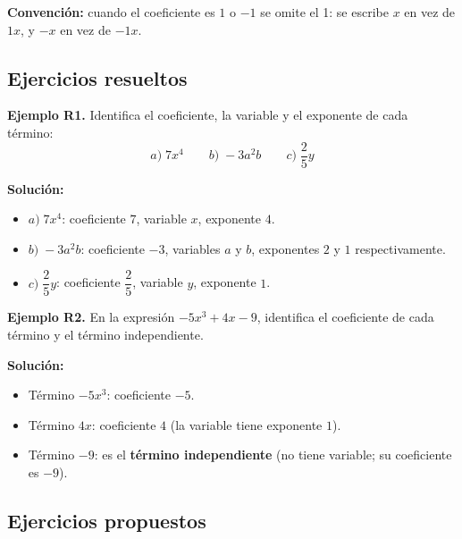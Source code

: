 \documentclass[12pt, letterpaper]{article}
\begin{document}
\begin{cuadroextra}
  \textbf{Convención:} cuando el coeficiente es $1$ o $-1$ se omite el 1: se escribe $x$ en vez de $1x$, y $-x$ en vez de $-1x$.
\end{cuadroextra}

\subsection{Ejercicios resueltos}

\textbf{Ejemplo R1.} Identifica el coeficiente, la variable y el exponente de cada término:
$$a) \; 7x^4 \qquad b) \; -3a^2b \qquad c) \; \frac{2}{5}y$$

\begin{cuadrosolucion}
  \textbf{Solución:}
  \begin{itemize}
    \item $a) \; 7x^4$: coeficiente $7$, variable $x$, exponente $4$.
    \item $b) \; -3a^2b$: coeficiente $-3$, variables $a$ y $b$, exponentes $2$ y $1$ respectivamente.
    \item $c) \; \dfrac{2}{5}y$: coeficiente $\dfrac{2}{5}$, variable $y$, exponente $1$.
  \end{itemize}
\end{cuadrosolucion}

\textbf{Ejemplo R2.} En la expresión $-5x^3 + 4x - 9$, identifica el coeficiente de cada término y el término independiente.

\begin{cuadrosolucion}
  \textbf{Solución:}
  \begin{itemize}
    \item Término $-5x^3$: coeficiente $-5$.
    \item Término $4x$: coeficiente $4$ (la variable tiene exponente $1$).
    \item Término $-9$: es el \textbf{término independiente} (no tiene variable; su coeficiente es $-9$).
  \end{itemize}
\end{cuadrosolucion}

\subsection{Ejercicios propuestos}
\end{document}

